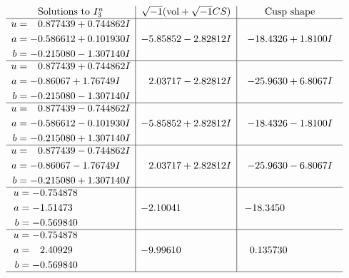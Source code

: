 \documentclass[1p]{elsarticle_modified}
\theoremstyle{definition}
\newcommand{\I}{\sqrt{-1}}
\begin{document}
$$\begin{array}{c|c|c}  
\text{Solutions to }I^u_{3}& \I (\text{vol} + \sqrt{-1}CS) & \text{Cusp shape}\\
 \hline 
\begin{aligned}
u &= \phantom{-}0.877439 + 0.744862 I \\
a &= -0.586612 + 0.101930 I \\
b &= -0.215080 - 1.307140 I\end{aligned}
 & -5.85852 - 2.82812 I & -18.4326 + 1.8100 I \\ \hline\begin{aligned}
u &= \phantom{-}0.877439 + 0.744862 I \\
a &= -0.86067 + 1.76749 I \\
b &= -0.215080 - 1.307140 I\end{aligned}
 & \phantom{-}2.03717 - 2.82812 I & -25.9630 + 6.8067 I \\ \hline\begin{aligned}
u &= \phantom{-}0.877439 - 0.744862 I \\
a &= -0.586612 - 0.101930 I \\
b &= -0.215080 + 1.307140 I\end{aligned}
 & -5.85852 + 2.82812 I & -18.4326 - 1.8100 I \\ \hline\begin{aligned}
u &= \phantom{-}0.877439 - 0.744862 I \\
a &= -0.86067 - 1.76749 I \\
b &= -0.215080 + 1.307140 I\end{aligned}
 & \phantom{-}2.03717 + 2.82812 I & -25.9630 - 6.8067 I \\ \hline\begin{aligned}
u &= -0.754878\phantom{ +0.000000I} \\
a &= -1.51473\phantom{ +0.000000I} \\
b &= -0.569840\phantom{ +0.000000I}\end{aligned}
 & -2.10041\phantom{ +0.000000I} & -18.3450\phantom{ +0.000000I} \\ \hline\begin{aligned}
u &= -0.754878\phantom{ +0.000000I} \\
a &= \phantom{-}2.40929\phantom{ +0.000000I} \\
b &= -0.569840\phantom{ +0.000000I}\end{aligned}
 & -9.99610\phantom{ +0.000000I} & \phantom{-}0.135730\phantom{ +0.000000I}\\
 \hline 
 \end{array}$$\newpage
\end{document}
